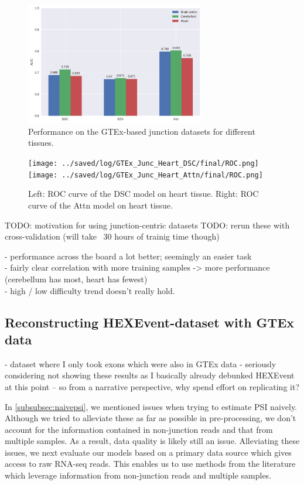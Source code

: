 \begin{figure}[h]
	\centering\includegraphics[width=0.7\textwidth]{../visualizations/gtex_junc_barcharts.png} 
	\caption{Performance on the GTEx-based junction datasets for different tissues. }
	\label{fig:gtex_junc_barcharts}
\end{figure}

\begin{figure}[h]
	\texttt{[image: ../saved/log/GTEx\_Junc\_Heart\_DSC/final/ROC.png]} 
	\texttt{[image: ../saved/log/GTEx\_Junc\_Heart\_Attn/final/ROC.png]}
	\caption{Left: ROC curve of the DSC model on heart tissue. Right: ROC curve of the Attn model on heart tissue. }
	\label{fig:gtex_junc_rocs}
\end{figure}
TODO: motivation for using junction-centric datasets
TODO: rerun these with cross-validation (will take ~30 hours of trainig time though)

- performance across the board a lot better; seemingly an easier task\\
- fairly clear correlation with more training samples -> more performance (cerebellum has most, heart has fewest)\\
- high / low difficulty trend doesn't really hold. 


\subsection{Reconstructing HEXEvent-dataset with GTEx data}
- dataset where I only took exons which were also in GTEx data
- seriously considering not showing these results as I basically already debunked HEXEvent at this point -- so from a narrative perspective, why spend effort on replicating it?



In \ref{subsubsec:naivepsi}, we mentioned issues when trying to estimate PSI naively. Although we tried to alleviate these as far as possible in pre-processing, we don't account for the information contained in non-junction reads and that from multiple samples. As a result, data quality is likely still an issue. Alleviating these issues, we next evaluate our models based on a primary data source which gives access to raw RNA-seq reads. This enables us to use methods from the literature which leverage information from non-junction reads and multiple samples.

